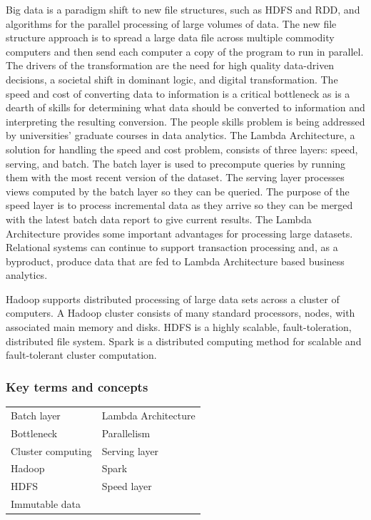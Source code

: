 \documentclass[
]{article}
\begin{document}
Big data is a paradigm shift to new file structures, such as HDFS and
RDD, and algorithms for the parallel processing of large volumes of
data. The new file structure approach is to spread a large data file
across multiple commodity computers and then send each computer a copy
of the program to run in parallel. The drivers of the transformation are
the need for high quality data-driven decisions, a societal shift in
dominant logic, and digital transformation. The speed and cost of
converting data to information is a critical bottleneck as is a dearth
of skills for determining what data should be converted to information
and interpreting the resulting conversion. The people skills problem is
being addressed by universities' graduate courses in data analytics. The
Lambda Architecture, a solution for handling the speed and cost problem,
consists of three layers: speed, serving, and batch. The batch layer is
used to precompute queries by running them with the most recent version
of the dataset. The serving layer processes views computed by the batch
layer so they can be queried. The purpose of the speed layer is to
process incremental data as they arrive so they can be merged with the
latest batch data report to give current results. The Lambda
Architecture provides some important advantages for processing large
datasets. Relational systems can continue to support transaction
processing and, as a byproduct, produce data that are fed to Lambda
Architecture based business analytics.

Hadoop supports distributed processing of large data sets across a
cluster of computers. A Hadoop cluster consists of many standard
processors, nodes, with associated main memory and disks. HDFS is a
highly scalable, fault-toleration, distributed file system. Spark is a
distributed computing method for scalable and fault-tolerant cluster
computation.

\hypertarget{key-terms-and-concepts-7}{%
\subsubsection*{Key terms and concepts}\label{key-terms-and-concepts-7}}

\begin{longtable}[]{@{}ll@{}}
\toprule
& \\
\midrule
\endhead
Batch layer & Lambda Architecture \\
Bottleneck & Parallelism \\
Cluster computing & Serving layer \\
Hadoop & Spark \\
HDFS & Speed layer \\
Immutable data & \\
\bottomrule
\end{longtable}
\end{document}
